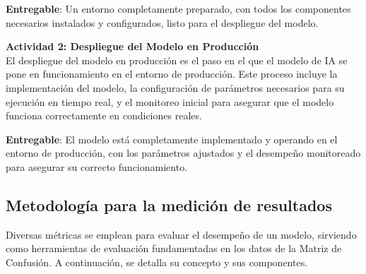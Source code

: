 \textbf{Entregable}: Un entorno completamente preparado, con todos los componentes necesarios instalados y configurados, listo para el despliegue del modelo.

\vspace{0.25cm}
\textbf{Actividad 2: Despliegue del Modelo en Producción}
\\
El despliegue del modelo en producción es el paso en el que el modelo de IA se pone en funcionamiento en el entorno de producción. Este proceso incluye la implementación del modelo, la configuración de parámetros necesarios para su ejecución en tiempo real, y el monitoreo inicial para asegurar que el modelo funciona correctamente en condiciones reales.

\textbf{Entregable}: El modelo está completamente implementado y operando en el entorno de producción, con los parámetros ajustados y el desempeño monitoreado para asegurar su correcto funcionamiento.

\vspace{0.5cm}
\subsection{Metodología para la medición de resultados}
Diversas métricas se emplean para evaluar el desempeño de un modelo, sirviendo como herramientas de evaluación fundamentadas en los datos de la Matriz de Confusión. A continuación, se detalla su concepto y sus componentes.

